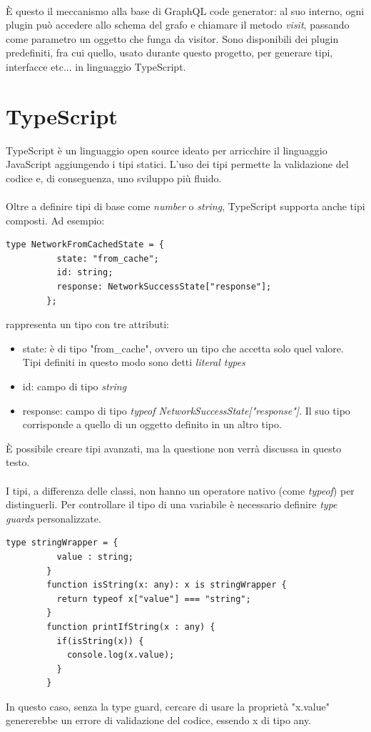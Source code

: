 \documentclass[a4paper, 12pt]{report}
\begin{document}
      \paragraph*{}È questo il meccanismo alla base di GraphQL code generator: al suo interno, ogni plugin può accedere allo schema del grafo e chiamare il metodo \emph{visit}, passando come parametro un oggetto che funga da visitor.
        Sono disponibili dei plugin predefiniti, fra cui quello, usato durante questo progetto, per generare tipi, interfacce etc... in linguaggio TypeScript.
    \newpage
    \section{TypeScript}
      TypeScript è un linguaggio open source ideato per arricchire il linguaggio JavaScript aggiungendo i tipi statici.
      L'uso dei tipi permette la validazione del codice e, di conseguenza, uno sviluppo più fluido.
      \paragraph*{}
      Oltre a definire tipi di base come \emph{number} o \emph{string}, TypeScript supporta anche tipi composti. Ad esempio:
      \begin{Verbatim}[samepage=true]
        type NetworkFromCachedState = {
          state: "from_cache";
          id: string;
          response: NetworkSuccessState["response"];
        };
      \end{Verbatim}
      rappresenta un tipo con tre attributi:
      \begin{itemize}
        \item state: è di tipo "from_cache", ovvero un tipo che accetta solo quel valore. Tipi definiti in questo modo sono detti \emph{literal types}
        \item id: campo di tipo \emph{string}
        \item response: campo di tipo \emph{typeof NetworkSuccessState["response"]}. Il suo tipo corrisponde a quello di un oggetto definito in un altro tipo.
      \end{itemize}
      È possibile creare tipi avanzati, ma la questione non verrà discussa in questo testo.
      \paragraph*{}
      I tipi, a differenza delle classi, non hanno un operatore nativo (come \emph{typeof}) per distinguerli.
      Per controllare il tipo di una variabile è necessario definire \emph{type guards} personalizzate.
      \begin{Verbatim}[samepage=true]
        type stringWrapper = {
          value : string;
        }
        function isString(x: any): x is stringWrapper {
          return typeof x["value"] === "string";
        }
        function printIfString(x : any) {
          if(isString(x)) {
            console.log(x.value);
          }
        }
      \end{Verbatim}
      In questo caso, senza la type guard, cercare di usare la proprietà "x.value" genererebbe un errore di validazione del codice, essendo x di tipo any.
    \newpage
\end{document}
